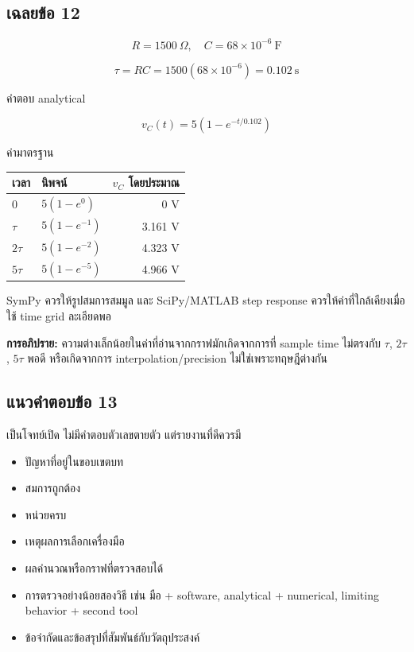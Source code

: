 \subsection{เฉลยข้อ 12}

\[
R=1500\ \Omega,\quad C=68\times10^{-6}\ \text{F}
\]

\[
\tau=RC=1500(68\times10^{-6})=0.102\ \text{s}
\]

คำตอบ analytical

\[
v_C(t)=5(1-e^{-t/0.102})
\]

ค่ามาตรฐาน

\begin{table}[htbp]
    \centering
    \begin{tabular}{l l r}
        \hline
        \textbf{เวลา} & \textbf{นิพจน์} & \textbf{$v_C$ โดยประมาณ} \\
        \hline
        $0$ & $5(1-e^0)$ & 0 V \\
        $\tau$ & $5(1-e^{-1})$ & 3.161 V \\
        $2\tau$ & $5(1-e^{-2})$ & 4.323 V \\
        $5\tau$ & $5(1-e^{-5})$ & 4.966 V \\
        \hline
    \end{tabular}
\end{table}

SymPy ควรให้รูปสมการสมมูล และ SciPy/MATLAB step response ควรให้ค่าที่ใกล้เคียงเมื่อใช้ time grid ละเอียดพอ

\textbf{การอภิปราย:} ความต่างเล็กน้อยในค่าที่อ่านจากกราฟมักเกิดจากการที่ sample time ไม่ตรงกับ $\tau$, $2\tau$, $5\tau$ พอดี หรือเกิดจากการ interpolation/precision ไม่ใช่เพราะทฤษฎีต่างกัน

\subsection{แนวคำตอบข้อ 13}

เป็นโจทย์เปิด ไม่มีคำตอบตัวเลขตายตัว แต่รายงานที่ดีควรมี

\begin{itemize}
    \item ปัญหาที่อยู่ในขอบเขตบท
    \item สมการถูกต้อง
    \item หน่วยครบ
    \item เหตุผลการเลือกเครื่องมือ
    \item ผลคำนวณหรือกราฟที่ตรวจสอบได้
    \item การตรวจอย่างน้อยสองวิธี เช่น มือ + software, analytical + numerical, limiting behavior + second tool
    \item ข้อจำกัดและข้อสรุปที่สัมพันธ์กับวัตถุประสงค์
\end{itemize}

